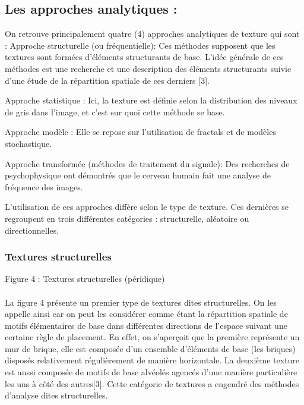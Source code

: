\documentclass[12pt]{article}
\begin{document}
\subsection{Les approches analytiques :}

On retrouve principalement quatre (4) approches analytiques de texture qui sont :
Approche structurelle (ou fréquentielle): Ces méthodes supposent que les textures sont formées d’éléments structurants de base. L’idée générale de ces méthodes est une recherche et une description des éléments structurants suivie d’une étude de la répartition spatiale de ces derniers [3].

Approche statistique : Ici, la texture est définie selon la distribution des niveaux de gris dans l’image, et c’est sur quoi cette méthode se base.

Approche modèle : Elle se repose sur l’utilisation de fractals et de modèles stochastique.

Approche transformée (méthodes de traitement du signale): Des recherches de  psychophysique ont démontrés que le cerveau humain fait une analyse de fréquence des images. 

L’utilisation de ces approches diffère selon le type de texture. Ces dernières se regroupent en trois différentes catégories : structurelle, aléatoire ou directionnelles.











\subsubsection{Textures structurelles}
				

Figure 4 : Textures structurelles (péridique)

\paragraph{}
La figure 4 présente un premier type de textures dites structurelles.
On les appelle ainsi car on peut les considérer comme étant la répartition spatiale de motifs élémentaires de base dans différentes directions de l’espace suivant une certaine règle de placement. En effet, on s’aperçoit que la première représente un mur de brique, elle est composée d’un ensemble d’éléments de base (les briques) disposés relativement régulièrement de manière horizontale. La deuxième texture est aussi composée de motifs de base alvéolés agencés d’une manière particulière les uns à côté des autres[3].
Cette catégorie de textures a engendré des méthodes d’analyse dites structurelles.
\end{document}

